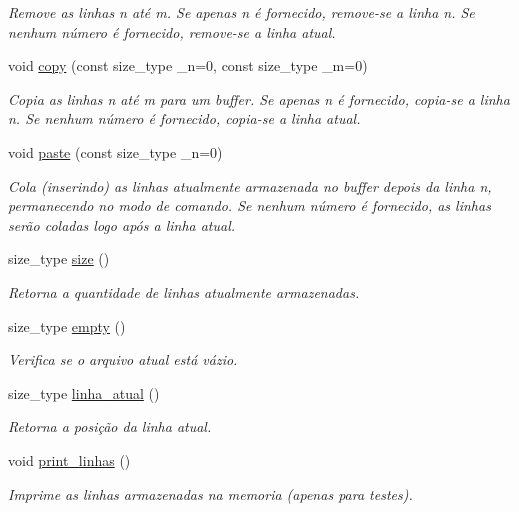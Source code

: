 \begin{DoxyCompactItemize}
\begin{DoxyCompactList}\small\item\em Remove as linhas n até m. Se apenas n é fornecido, remove-\/se a linha n. Se nenhum número é fornecido, remove-\/se a linha atual. \end{DoxyCompactList}\item 
void \hyperlink{classelis_ae482e818bd705f4a0fa326ca2c6c6b06}{copy} (const size\+\_\+type \+\_\+n=0, const size\+\_\+type \+\_\+m=0)
\begin{DoxyCompactList}\small\item\em Copia as linhas n até m para um buffer. Se apenas n é fornecido, copia-\/se a linha n. Se nenhum número é fornecido, copia-\/se a linha atual. \end{DoxyCompactList}\item 
void \hyperlink{classelis_ad140924a1cb1425b573934a3abd4475c}{paste} (const size\+\_\+type \+\_\+n=0)
\begin{DoxyCompactList}\small\item\em Cola (inserindo) as linhas atualmente armazenada no buffer depois da linha n, permanecendo no modo de comando. Se nenhum número é fornecido, as linhas serão coladas logo após a linha atual. \end{DoxyCompactList}\item 
size\+\_\+type \hyperlink{classelis_ab869080dfc9c83c577e4550eed1f17c1}{size} ()
\begin{DoxyCompactList}\small\item\em Retorna a quantidade de linhas atualmente armazenadas. \end{DoxyCompactList}\item 
size\+\_\+type \hyperlink{classelis_a20956774b5e7ce5bdb6e411c027497f4}{empty} ()
\begin{DoxyCompactList}\small\item\em Verifica se o arquivo atual está vázio. \end{DoxyCompactList}\item 
size\+\_\+type \hyperlink{classelis_ae2b126d77fd190c84cabb303537a5265}{linha\+\_\+atual} ()
\begin{DoxyCompactList}\small\item\em Retorna a posição da linha atual. \end{DoxyCompactList}\item 
\mbox{\label{classelis_a32d5c4a0f9d37079b6115495a226b1e9}} 
void \hyperlink{classelis_a32d5c4a0f9d37079b6115495a226b1e9}{print\+\_\+linhas} ()
\begin{DoxyCompactList}\small\item\em Imprime as linhas armazenadas na memoria (apenas para testes). \end{DoxyCompactList}\end{DoxyCompactItemize}


